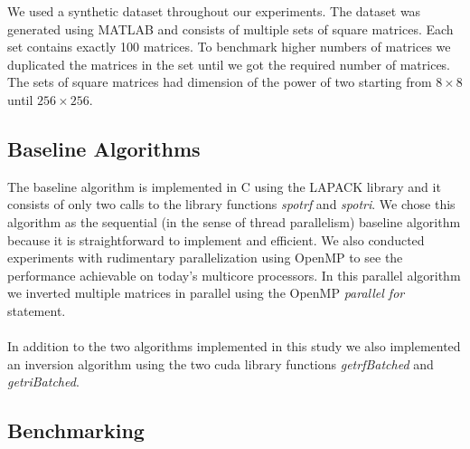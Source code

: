 \documentclass[11pt]{article}
\begin{document}
We used a synthetic dataset throughout our experiments. The dataset was generated using MATLAB and consists of multiple sets of square matrices. Each set contains exactly 100 matrices. To benchmark higher numbers of matrices we duplicated the matrices in the set until we got the required number of matrices. The sets of square matrices had dimension of the power of two starting from $8 \times 8$ until $256 \times 256$.

\subsection{Baseline Algorithms}

The baseline algorithm is implemented in C using the LAPACK library and it consists of only two calls to the library functions {\it spotrf} and {\it spotri}. We chose this algorithm as the sequential (in the sense of thread parallelism) baseline algorithm because it is straightforward to implement and efficient. We also conducted experiments with rudimentary parallelization using OpenMP to see the performance achievable on today's multicore processors. In this parallel algorithm we inverted multiple matrices in parallel using the OpenMP \textit{parallel for} statement.\\\\
In addition to the two algorithms implemented in this study we also implemented an inversion algorithm using the two cuda library functions {\it getrfBatched} and {\it getriBatched}.

\subsection{Benchmarking}
\end{document}
